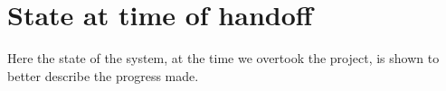 \chapter{State at time of handoff}\label{app:state-at-handoff}

Here the state of the system, at the time we overtook the project, is shown to better describe the progress made.



